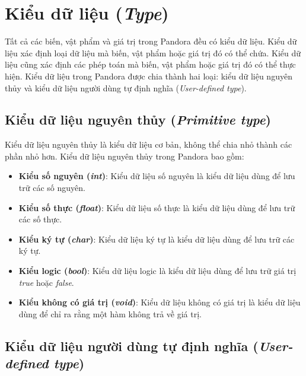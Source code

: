 \section{Kiểu dữ liệu (\textit{Type})}

\regexty

Tất cả các biến, vật phẩm và giá trị trong Pandora đều có kiểu dữ liệu. Kiểu dữ liệu xác định loại dữ liệu mà biến, vật phẩm hoặc giá trị đó có thể chứa. Kiểu dữ liệu cũng xác định các phép toán mà biến, vật phẩm hoặc giá trị đó có thể thực hiện. Kiểu dữ liệu trong Pandora được chia thành hai loại: kiểu dữ liệu nguyên thủy và kiểu dữ liệu người dùng tự định nghĩa (\textit{User-defined type}).

\subsection{Kiểu dữ liệu nguyên thủy (\textit{Primitive type})}

Kiểu dữ liệu nguyên thủy là kiểu dữ liệu cơ bản, không thể chia nhỏ thành các phần nhỏ hơn. Kiểu dữ liệu nguyên thủy trong Pandora bao gồm:

\begin{itemize}
    \item \textbf{Kiểu số nguyên (\textit{int})}: Kiểu dữ liệu số nguyên là kiểu dữ liệu dùng để lưu trữ các số nguyên.
    
    \item \textbf{Kiểu số thực (\textit{float})}: Kiểu dữ liệu số thực là kiểu dữ liệu dùng để lưu trữ các số thực.

    \item \textbf{Kiểu ký tự (\textit{char})}: Kiểu dữ liệu ký tự là kiểu dữ liệu dùng để lưu trữ các ký tự.

    \item \textbf{Kiểu logic (\textit{bool})}: Kiểu dữ liệu logic là kiểu dữ liệu dùng để lưu trữ giá trị \textit{true} hoặc \textit{false}.

    \item \textbf{Kiểu không có giá trị (\textit{void})}: Kiểu dữ liệu không có giá trị là kiểu dữ liệu dùng để chỉ ra rằng một hàm không trả về giá trị.
\end{itemize}

\subsection{Kiểu dữ liệu người dùng tự định nghĩa (\textit{User-defined type})}


